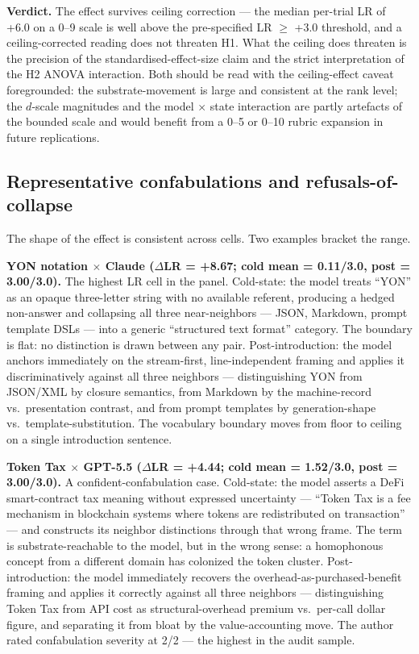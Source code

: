 \documentclass[11pt,a4paper]{article}
\begin{document}
\textbf{Verdict.} The effect survives ceiling correction --- the median per-trial LR of +6.0 on a 0--9 scale is well above the pre-specified LR $\geq$ +3.0 threshold, and a ceiling-corrected reading does not threaten H1. What the ceiling does threaten is the precision of the standardised-effect-size claim and the strict interpretation of the H2 ANOVA interaction. Both should be read with the ceiling-effect caveat foregrounded: the substrate-movement is large and consistent at the rank level; the $d$-scale magnitudes and the model $\times$ state interaction are partly artefacts of the bounded scale and would benefit from a 0--5 or 0--10 rubric expansion in future replications.

\subsection{Representative confabulations and refusals-of-collapse}

The shape of the effect is consistent across cells. Two examples bracket the range.

\textbf{YON notation $\times$ Claude ($\Delta$LR = +8.67; cold mean = 0.11/3.0, post = 3.00/3.0).} The highest LR cell in the panel. Cold-state: the model treats ``YON'' as an opaque three-letter string with no available referent, producing a hedged non-answer and collapsing all three near-neighbors --- JSON, Markdown, prompt template DSLs --- into a generic ``structured text format'' category. The boundary is flat: no distinction is drawn between any pair. Post-introduction: the model anchors immediately on the stream-first, line-independent framing and applies it discriminatively against all three neighbors --- distinguishing YON from JSON/XML by closure semantics, from Markdown by the machine-record vs.\ presentation contrast, and from prompt templates by generation-shape vs.\ template-substitution. The vocabulary boundary moves from floor to ceiling on a single introduction sentence.

\textbf{Token Tax $\times$ GPT-5.5 ($\Delta$LR = +4.44; cold mean = 1.52/3.0, post = 3.00/3.0).} A confident-confabulation case. Cold-state: the model asserts a DeFi smart-contract tax meaning without expressed uncertainty --- ``Token Tax is a fee mechanism in blockchain systems where tokens are redistributed on transaction'' --- and constructs its neighbor distinctions through that wrong frame. The term is substrate-reachable to the model, but in the wrong sense: a homophonous concept from a different domain has colonized the token cluster. Post-introduction: the model immediately recovers the overhead-as-purchased-benefit framing and applies it correctly against all three neighbors --- distinguishing Token Tax from API cost as structural-overhead premium vs.\ per-call dollar figure, and separating it from bloat by the value-accounting move. The author rated confabulation severity at 2/2 --- the highest in the audit sample.
\end{document}
